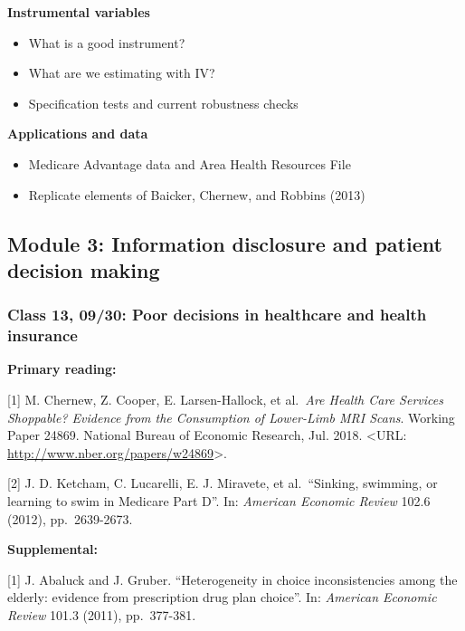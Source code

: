 \documentclass[11pt,]{article}
\providecommand{\tightlist}{%
  \setlength{\itemsep}{0pt}\setlength{\parskip}{0pt}}
\begin{document}
\textbf{Instrumental variables}

\begin{itemize}
\tightlist
\item
  What is a good instrument?
\item
  What are we estimating with IV?
\item
  Specification tests and current robustness checks
\end{itemize}

\textbf{Applications and data}

\begin{itemize}
\tightlist
\item
  Medicare Advantage data and Area Health Resources File
\item
  Replicate elements of Baicker, Chernew, and Robbins (2013)
\end{itemize}

\hypertarget{module-3-information-disclosure-and-patient-decision-making}{%
\subsection{Module 3: Information disclosure and patient decision
making}\label{module-3-information-disclosure-and-patient-decision-making}}

\hypertarget{class-13-0930-poor-decisions-in-healthcare-and-health-insurance}{%
\subsubsection{Class 13, 09/30: Poor decisions in healthcare and health
insurance}\label{class-13-0930-poor-decisions-in-healthcare-and-health-insurance}}

\textbf{Primary reading:}

{[}1{]} M. Chernew, Z. Cooper, E. Larsen-Hallock, et al.~\emph{Are
Health Care Services Shoppable? Evidence from the Consumption of
Lower-Limb MRI Scans}. Working Paper 24869. National Bureau of Economic
Research, Jul. 2018. \textless URL:
\url{http://www.nber.org/papers/w24869}\textgreater.

{[}2{]} J. D. Ketcham, C. Lucarelli, E. J. Miravete, et al.~``Sinking,
swimming, or learning to swim in Medicare Part D''. In: \emph{American
Economic Review} 102.6 (2012), pp.~2639-2673.

\textbf{Supplemental:}

{[}1{]} J. Abaluck and J. Gruber. ``Heterogeneity in choice
inconsistencies among the elderly: evidence from prescription drug plan
choice''. In: \emph{American Economic Review} 101.3 (2011), pp.~377-381.
\end{document}
